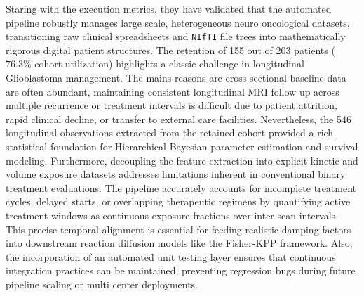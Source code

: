 Staring with the execution metrics, they have validated that the automated pipeline robustly manages large scale, heterogeneous neuro oncological datasets, transitioning raw clinical spreadsheets and \texttt{NIfTI} file trees into mathematically rigorous digital patient structures. The retention of 155 out of 203 patients ($76.3\%$ cohort utilization) highlights a classic challenge in longitudinal Glioblastoma management. The mains reasons are cross sectional baseline data are often abundant, maintaining consistent longitudinal MRI follow up across multiple recurrence or treatment intervals is difficult due to patient attrition, rapid clinical decline, or transfer to external care facilities. Nevertheless, the 546 longitudinal observations extracted from the retained cohort provided a rich statistical foundation for Hierarchical Bayesian parameter estimation and survival modeling. Furthermore, decoupling the feature extraction into explicit kinetic and volume exposure datasets addresses limitations inherent in conventional binary treatment evaluations. The pipeline accurately accounts for incomplete treatment cycles, delayed starts, or overlapping therapeutic regimens by quantifying active treatment windows as continuous exposure fractions over inter scan intervals. This precise temporal alignment is essential for feeding realistic damping factors into downstream reaction diffusion models like the Fisher-KPP framework. Also, the incorporation of an automated unit testing layer ensures that continuous integration practices can be maintained, preventing regression bugs during future pipeline scaling or multi center deployments.

